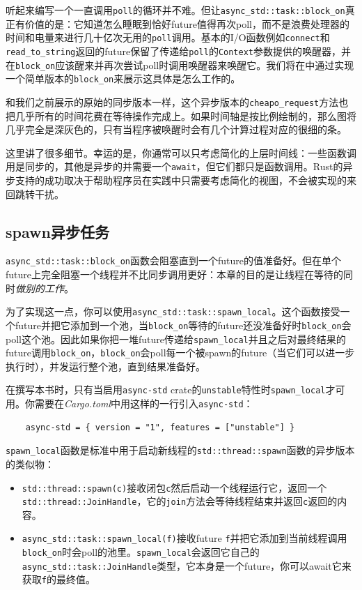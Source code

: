 听起来编写一个一直调用\texttt{poll}的循环并不难。但让\texttt{async\_std::task::block\_on}真正有价值的是：它知道怎么睡眠到恰好future值得再次poll，而不是浪费处理器的时间和电量来进行几十亿次无用的\texttt{poll}调用。基本的I/O函数例如\texttt{connect}和\texttt{read\_to\_string}返回的future保留了传递给\texttt{poll}的\texttt{Context}参数提供的唤醒器，并在\texttt{block\_on}应该醒来并再次尝试poll时调用唤醒器来唤醒它。我们将在中通过实现一个简单版本的\texttt{block\_on}来展示这具体是怎么工作的。

和我们之前展示的原始的同步版本一样，这个异步版本的\texttt{cheapo\_request}方法也把几乎所有的时间花费在等待操作完成上。如果时间轴是按比例绘制的，那么图将几乎完全是深灰色的，只有当程序被唤醒时会有几个计算过程对应的很细的条。

这里讲了很多细节。幸运的是，你通常可以只考虑简化的上层时间线：一些函数调用是同步的，其他是异步的并需要一个\texttt{await}，但它们都只是函数调用。Rust的异步支持的成功取决于帮助程序员在实践中只需要考虑简化的视图，不会被实现的来回跳转干扰。

\subsection{spawn异步任务}
\texttt{async\_std::task::block\_on}函数会阻塞直到一个future的值准备好。但在单个future上完全阻塞一个线程并不比同步调用更好：本章的目的是让线程在等待的同时\emph{做别的工作}。

为了实现这一点，你可以使用\texttt{async\_std::task::spawn\_local}。这个函数接受一个future并把它添加到一个池，当\texttt{block\_on}等待的future还没准备好时\texttt{block\_on}会poll这个池。因此如果你把一堆future传递给\texttt{spawn\_local}并且之后对最终结果的future调用\texttt{block\_on}，\texttt{block\_on}会poll每一个被spawn的future（当它们可以进一步执行时），并发运行整个池，直到结果准备好。

在撰写本书时，只有当启用\texttt{async-std} crate的\texttt{unstable}特性时\texttt{spawn\_local}才可用。你需要在\emph{Cargo.toml}中用这样的一行引入\texttt{async-std}：
\begin{verbatim}
    async-std = { version = "1", features = ["unstable"] }
\end{verbatim}

\texttt{spawn\_local}函数是标准中用于启动新线程的\texttt{std::thread::spawn}函数的异步版本的类似物：
\begin{itemize}
    \item \texttt{std::thread::spawn(c)}接收闭包\texttt{c}然后启动一个线程运行它，返回一个\\
    \texttt{std::thread::JoinHandle}，它的\texttt{join}方法会等待线程结束并返回\texttt{c}返回的内容。
    \item \texttt{async\_std::task::spawn\_local(f)}接收future \texttt{f}并把它添加到当前线程调用\texttt{block\_on}时会poll的池里。\texttt{spawn\_local}会返回它自己的\texttt{async\_std::task::JoinHandle}类型，它本身是一个future，你可以await它来获取\texttt{f}的最终值。
\end{itemize}

